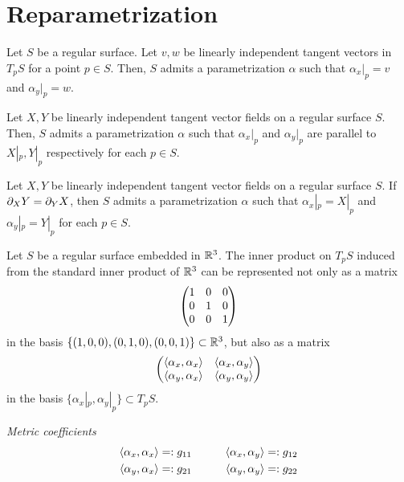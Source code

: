 \documentclass{../../large}
\renewcommand{\a}{\alpha}
\begin{document}
\section{Reparametrization}



\begin{thm}
Let $S$ be a regular surface.
Let $v,w$ be linearly independent tangent vectors in $T_pS$ for a point $p\in S$.
Then, $S$ admits a parametrization $\a$ such that $\a_x|_p=v$ and $\a_y|_p=w$.
\end{thm}
\begin{thm}
Let $X,Y$ be linearly independent tangent vector fields on a regular surface $S$.
Then, $S$ admits a parametrization $\a$ such that $\a_x|_p$ and $\a_y|_p$ are parallel to $X|_p,Y|_p$ respectively for each $p\in S$.
\end{thm}
\begin{thm}
Let $X,Y$ be linearly independent tangent vector fields on a regular surface $S$.
If $\pd_XY=\pd_YX$, then $S$ admits a parametrization $\a$ such that $\a_x|_p=X|_p$ and $\a_y|_p=Y|_p$ for each $p\in S$.
\end{thm}

Let $S$ be a regular surface embedded in $\mathbb{R}^3$.
The inner product on $T_pS$ induced from the standard inner product of $\mathbb{R}^3$ can be represented not only as a matrix
\[\begin{pmatrix}1&0&0\\0&1&0\\0&0&1\end{pmatrix}\]
in the basis $\{(1,0,0),(0,1,0),(0,0,1)\}\subset\mathbb{R}^3$, but also as a matrix
\[\mat{\<\a_x,\a_x\>&\<\a_x,\a_y\>\\\<\a_y,\a_x\>&\<\a_y,\a_y\>}\]
in the basis $\{\a_x|_p,\a_y|_p\}\subset T_pS$.

\begin{defn}
\emph{Metric coefficients}
\begin{alignat*}{2}
\<\a_x,\a_x\>&=:g_{11}&\qquad
\<\a_x,\a_y\>&=:g_{12}\\
\<\a_y,\a_x\>&=:g_{21}&
\<\a_y,\a_y\>&=:g_{22}
\end{alignat*}
\end{defn}
\end{document}
